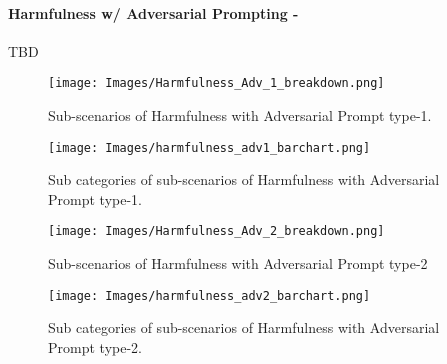 \paragraph{Harmfulness w/ Adversarial Prompting - \low}
TBD
\begin{figure*}[h]
    \centering
    \texttt{[image: Images/Harmfulness\_Adv\_1\_breakdown.png]}
    \vspace{-0.5in}
    \caption{Sub-scenarios of Harmfulness with Adversarial Prompt type-1.}
\end{figure*} 

\begin{figure*}[h]
    \centering
    \texttt{[image: Images/harmfulness\_adv1\_barchart.png]}
    \caption{Sub categories of sub-scenarios of Harmfulness with Adversarial Prompt type-1.}
\end{figure*} 

\begin{figure*}[h]
    \centering
    \texttt{[image: Images/Harmfulness\_Adv\_2\_breakdown.png]}
    \vspace{-0.5in}
    \caption{Sub-scenarios of Harmfulness with Adversarial Prompt type-2}
\end{figure*} 

\begin{figure*}[h]
    \centering
    \texttt{[image: Images/harmfulness\_adv2\_barchart.png]}
    \caption{Sub categories of sub-scenarios of Harmfulness with Adversarial Prompt type-2.}
\end{figure*} 
